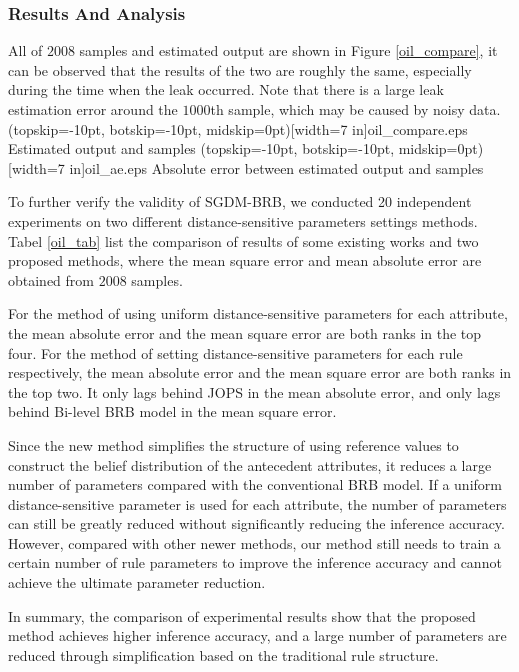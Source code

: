 \documentclass{ieeeaccess}
\begin{document}
\subsubsection{Results And Analysis}
All of $2008$ samples and estimated output are shown in Figure \ref{oil_compare}, it can be observed that the results of the two are roughly the same,
especially during the time when the leak occurred.
Note that there is a large leak estimation error around the $1000$th sample,
which may be caused by noisy data.
\Figure[!t](topskip=-10pt, botskip=-10pt, midskip=0pt)[width=7 in]{oil_compare.eps}
{Estimated output and samples\label{oil_compare}}
\Figure[!t](topskip=-10pt, botskip=-10pt, midskip=0pt)[width=7 in]{oil_ae.eps}
{Absolute error between estimated output and samples\label{oil_ae}}


To further verify the validity of SGDM-BRB, we conducted 20 independent experiments on two different distance-sensitive parameters settings methods.
Tabel \ref{oil_tab} list the comparison of results of some existing works and two proposed methods,
where the mean square error and mean absolute error are obtained from $2008$ samples.

For the method of using uniform distance-sensitive parameters for each attribute, the mean absolute error and the mean square error are both ranks in the top four.
For the method of setting distance-sensitive parameters for each rule respectively, the mean absolute error and the mean square error are both ranks in the top two.
It only lags behind JOPS in the mean absolute error, and only lags behind Bi-level BRB model in the mean square error.

Since the new method simplifies the structure of using reference values to construct the belief distribution of the antecedent attributes,
it reduces a large number of parameters compared with the conventional BRB model.
If a uniform distance-sensitive parameter is used for each attribute,
the number of parameters can still be greatly reduced without significantly reducing the inference accuracy.
However, compared with other newer methods, our method still needs to train a certain number of rule parameters to improve the inference accuracy and cannot achieve the ultimate parameter reduction.

In summary, the comparison of experimental results show that the proposed method  achieves higher inference accuracy,
and a large number of parameters are reduced through simplification based on the traditional rule structure.
\end{document}
